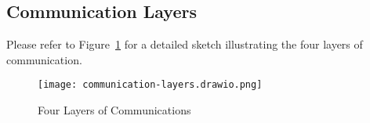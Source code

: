 \subsection{Communication Layers}
Please refer to Figure~\ref{fig:task1-3} for a detailed sketch illustrating the four layers of communication.

\begin{figure}[h]
    \centering
    \texttt{[image: communication-layers.drawio.png]} %
    \caption{Four Layers of Communications}
    \label{fig:task1-3}
\end{figure}

